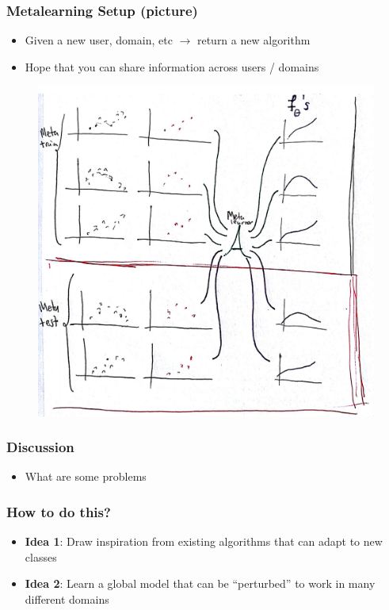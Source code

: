 \documentclass[10pt,mathserif]{beamer}
\begin{document}
\begin{frame}
  \frametitle{Metalearning Setup (picture)}
\begin{itemize}
\item Given a new user, domain, etc $\rightarrow$ return a new algorithm
\item Hope that you can share information across users / domains
\end{itemize}
 \begin{figure}[ht]
   \centering
   \includegraphics[width=0.45\paperwidth]{figure/metalearning_setup_curves}
   \caption{\label{fig:metalearning_setup_curves} }
 \end{figure}
\end{frame}

\begin{frame}
  \frametitle{Discussion}
  \begin{itemize}
  \item What are some problems 
  \end{itemize}  
\end{frame}

\begin{frame}
  \frametitle{How to do this?}
  \begin{itemize}
  \item \textbf{Idea 1}: Draw inspiration from existing algorithms that can
    adapt to new classes
  \item \textbf{Idea 2}: Learn a global model that can be ``perturbed'' to work
    in many different domains
  \end{itemize}
\end{frame}
\end{document}
